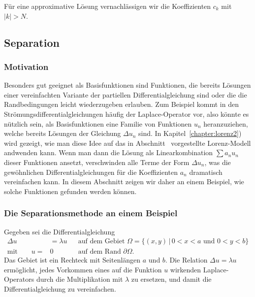 Für eine approximative Lösung vernachlässigen wir die Koeffizienten $c_k$
mit $|k|>N$.


\subsection{Separation}
%
\subsubsection{Motivation}
Besonders gut geeignet als Basisfunktionen sind Funktionen, die bereits
Lösungen einer vereinfachten Variante der partiellen Differentialgleichung
sind oder die die Randbedingungen leicht wiederzugeben erlauben.
Zum Beispiel kommt in den Strömungsdifferentialgleichungen häufig der
Laplace-Operator vor, also könnte es nützlich sein, als Basisfunktionen
eine Familie von Funktionen $u_n$ heranzuziehen, welche bereits Lösungen
der Gleichung $\Delta u_n$ sind. In Kapitel~\ref{chapter:lorenz2}) wird
gezeigt, wie man diese Idee auf das in
Abschnitt~\label{section:lorenz-modell} vorgestellte Lorenz-Modell
andwenden kann.
Wenn man dann die Lösung als Linearkombination $\sum a_nu_n$ dieser Funktionen
ansetzt, verschwinden alle Terme der Form $\Delta u_n$, was die gewöhnlichen
Differentialgleichungen für die Koeffizienten $a_n$ dramatisch vereinfachen
kann.
In diesem Abschnitt zeigen wir daher an einem Beispiel, wie solche Funktionen
gefunden werden können. 

\subsubsection{Die Separationsmethode an einem Beispiel}
Gegeben sei die Differentialgleichung
\[
\begin{aligned}
\Delta u &= \lambda u&&
\text{auf dem Gebiet $\Omega=\{ (x,y)\,|\, 0<x<a\text{ und }0<y<b\}$}
\\
\text{mit}
\qquad
u=&0&&\text{auf dem Rand $\partial\Omega$.}
\end{aligned}
\]
Das Gebiet ist ein Rechteck mit Seitenlängen $a$ und $b$.
Die Relation $\Delta u=\lambda u$ ermöglicht, jedes Vorkommen eines auf
die Funktion $u$ wirkenden Laplace-Operators durch die Multiplikation
mit $\lambda$ zu ersetzen, und damit die Differentialgleichung zu vereinfachen.


